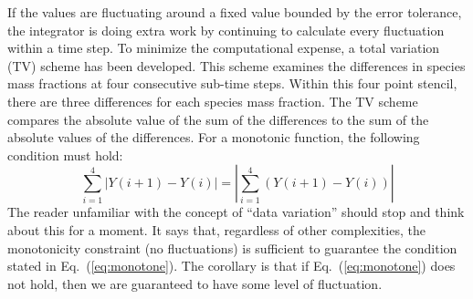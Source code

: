 If the values are fluctuating around a fixed value bounded by the error tolerance, the integrator is doing extra work by
continuing to calculate every fluctuation within a time step. To minimize the computational expense, a total variation (TV) scheme
has been developed. This scheme examines the differences in species mass fractions at four consecutive sub-time steps. Within this
four point stencil, there are three differences for each species mass fraction. The TV scheme compares the absolute value of the
sum of the differences to the sum of the absolute values of the differences.  For a monotonic function, the following condition
must hold:
\begin{equation}\label{eq:monotone}
\sum_{i=1}^{4}|Y(i+1)-Y(i)| = |\sum_{i=1}^{4}(Y(i+1)-Y(i))|
\end{equation}
The reader unfamiliar with the concept of ``data variation'' should stop and think about this for a moment.  It says that,
regardless of other complexities, the monotonicity constraint (no fluctuations) is sufficient to guarantee the condition stated in
Eq.~(\ref{eq:monotone}).  The corollary is that if Eq.~(\ref{eq:monotone}) does not hold, then we are guaranteed to have some
level of fluctuation.

